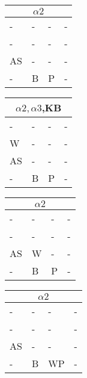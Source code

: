 \documentclass{math}
\begin{document}
\begin{center}
  \begin{tabular}{|p{0.6cm}|p{0.6cm}|p{0.6cm}|p{0.6cm}|}
    \hline
    \multicolumn{4}{|c|}{\( \alpha2 \)} \\ \hline
    - & - & - & - \\ \hline
    - & - & - & - \\ \hline
    AS & - & - & - \\ \hline
    - & B & P & - \\ \hline
  \end{tabular}
  \begin{tabular}{|p{0.6cm}|p{0.6cm}|p{0.6cm}|p{0.6cm}|}
    \hline
    \multicolumn{4}{|c|}{\( \alpha2,\alpha3 \),KB} \\ \hline
    - & - & - & - \\ \hline
    W & - & - & - \\ \hline
    AS & - & - & - \\ \hline
    - & B & P & - \\ \hline
  \end{tabular}
  \begin{tabular}{|p{0.6cm}|p{0.6cm}|p{0.6cm}|p{0.6cm}|}
    \hline
    \multicolumn{4}{|c|}{\( \alpha2 \)} \\ \hline
    - & - & - & - \\ \hline
    - & - & - & - \\ \hline
    AS & W & - & - \\ \hline
    - & B & P & - \\ \hline
  \end{tabular}
  \begin{tabular}{|p{0.6cm}|p{0.6cm}|p{0.6cm}|p{0.6cm}|}
    \hline
    \multicolumn{4}{|c|}{\( \alpha2 \)} \\ \hline
    - & - & - & - \\ \hline
    - & - & - & - \\ \hline
    AS & - & - & - \\ \hline
    - & B & WP & - \\ \hline
  \end{tabular} \\[0.5cm]


\end{center}
\end{document}
